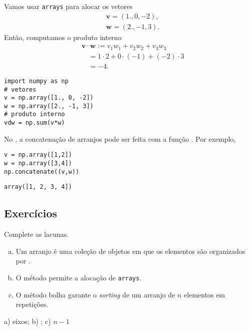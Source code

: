 \begin{ex}
  Vamos usar \texttt{arrays} para alocar os vetores
  \begin{align}
    & \pmb{v} = (1., 0, -2),\\
    & \pmb{w} = (2., -1, 3).
  \end{align}
  Então, computamos o produto interno
  \begin{align}
    & \pmb{v}\cdot\pmb{w} := v_1w_1 + v_2w_2 + v_3w_3 \\
    & \text{}\quad = 1\cdot 2 + 0\cdot(-1) + (-2)\cdot 3 \\
    & \text{}\quad = -4.
  \end{align}

\begin{lstlisting}
import numpy as np
# vetores
v = np.array([1., 0, -2])
w = np.array([2., -1, 3])
# produto interno
vdw = np.sum(v*w)
\end{lstlisting}

\end{ex}

\begin{obs}
  No {\numpy}, a concatenação de arranjos pode ser feita com a função {\PYTHONnumpyDOTconcatenate}. Por exemplo,

\begin{lstlisting}
v = np.array([1,2])
w = np.array([3,4])
np.concatenate((v,w))
\end{lstlisting}

\begin{verbatim}
array([1, 2, 3, 4])
\end{verbatim}

\end{obs}

\subsection{Exercícios}


\begin{exer}
  Complete as lacunas.
  \begin{enumerate}[a)]
    \item Um arranjo é uma coleção de objetos em que os elementos são organizados por \underline{\phantom{eixos}}.
    \item O método \underline{\phantom{\PYTHONnumpyDOTarray}} permite a alocação de \texttt{arrays}.
    \item O método bolha garante o \textit{sorting} de um arranjo de $n$ elementos em \underline{\phantom{$n-1$}} repetições.
  \end{enumerate}
\end{exer}
\begin{resp}
  a) eixos; b) {\PYTHONnumpyDOTarray}; c) $n-1$
\end{resp}

